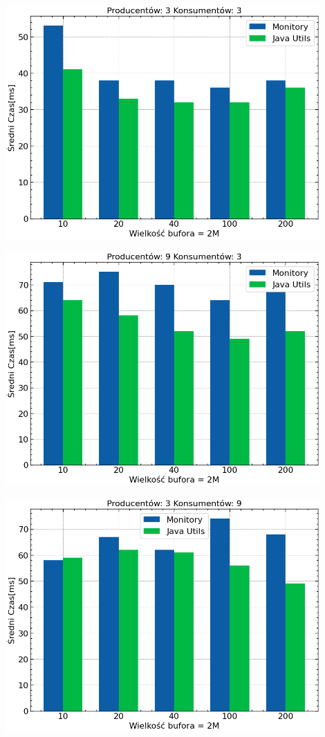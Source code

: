 \documentclass[11pt]{article}
\begin{document}
\begin{center}
\includegraphics[width=12cm]{./m3_n3.png}
\end{center}

\begin{center}
\includegraphics[width=12cm]{./m9_n3.png}
\end{center}

\begin{center}
\includegraphics[width=12cm]{./m3_n9.png}
\end{center}
\end{document}
